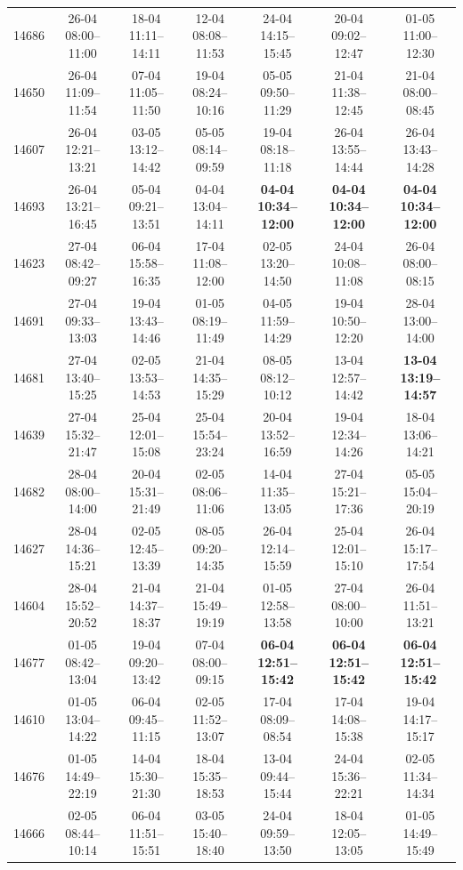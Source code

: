 \begin{table}[htbp]
\begin{tabular}{|r|c|c|c|c|c|c|}
14686 & 26-04 08:00--11:00 & 18-04 11:11--14:11 & 12-04 08:08--11:53 & 24-04 14:15--15:45 & 20-04 09:02--12:47 & 01-05 11:00--12:30 \\ 
14650 & 26-04 11:09--11:54 & 07-04 11:05--11:50 & 19-04 08:24--10:16 & 05-05 09:50--11:29 & 21-04 11:38--12:45 & 21-04 08:00--08:45 \\ 
14607 & 26-04 12:21--13:21 & 03-05 13:12--14:42 & 05-05 08:14--09:59 & 19-04 08:18--11:18 & 26-04 13:55--14:44 & 26-04 13:43--14:28 \\ 
14693 & 26-04 13:21--16:45 & 05-04 09:21--13:51 & 04-04 13:04--14:11 & \textbf{04-04 10:34--12:00} & \textbf{04-04 10:34--12:00} & \textbf{04-04 10:34--12:00} \\ 
14623 & 27-04 08:42--09:27 & 06-04 15:58--16:35 & 17-04 11:08--12:00 & 02-05 13:20--14:50 & 24-04 10:08--11:08 & 26-04 08:00--08:15 \\ 
14691 & 27-04 09:33--13:03 & 19-04 13:43--14:46 & 01-05 08:19--11:49 & 04-05 11:59--14:29 & 19-04 10:50--12:20 & 28-04 13:00--14:00 \\ 
14681 & 27-04 13:40--15:25 & 02-05 13:53--14:53 & 21-04 14:35--15:29 & 08-05 08:12--10:12 & 13-04 12:57--14:42 & \textbf{13-04 13:19--14:57} \\ 
14639 & 27-04 15:32--21:47 & 25-04 12:01--15:08 & 25-04 15:54--23:24 & 20-04 13:52--16:59 & 19-04 12:34--14:26 & 18-04 13:06--14:21 \\ 
14682 & 28-04 08:00--14:00 & 20-04 15:31--21:49 & 02-05 08:06--11:06 & 14-04 11:35--13:05 & 27-04 15:21--17:36 & 05-05 15:04--20:19 \\ 
14627 & 28-04 14:36--15:21 & 02-05 12:45--13:39 & 08-05 09:20--14:35 & 26-04 12:14--15:59 & 25-04 12:01--15:10 & 26-04 15:17--17:54 \\ 
14604 & 28-04 15:52--20:52 & 21-04 14:37--18:37 & 21-04 15:49--19:19 & 01-05 12:58--13:58 & 27-04 08:00--10:00 & 26-04 11:51--13:21 \\ 
14677 & 01-05 08:42--13:04 & 19-04 09:20--13:42 & 07-04 08:00--09:15 & \textbf{06-04 12:51--15:42} & \textbf{06-04 12:51--15:42} & \textbf{06-04 12:51--15:42} \\ 
14610 & 01-05 13:04--14:22 & 06-04 09:45--11:15 & 02-05 11:52--13:07 & 17-04 08:09--08:54 & 17-04 14:08--15:38 & 19-04 14:17--15:17 \\ 
14676 & 01-05 14:49--22:19 & 14-04 15:30--21:30 & 18-04 15:35--18:53 & 13-04 09:44--15:44 & 24-04 15:36--22:21 & 02-05 11:34--14:34 \\ 
14666 & 02-05 08:44--10:14 & 06-04 11:51--15:51 & 03-05 15:40--18:40 & 24-04 09:59--13:50 & 18-04 12:05--13:05 & 01-05 14:49--15:49 \\ 

\end{tabular}
\end{table}

